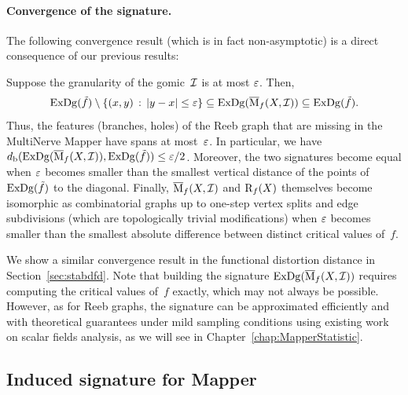 \paragraph*{Convergence of the signature.} The following convergence
result (which is in fact non-asymptotic) is a direct consequence of
our previous results:
%
\begin{cor}\label{cor:Reeb_approx}
Suppose the granularity of the gomic~$\mathcal{I}$ is at most $\varepsilon$. Then, 
%
\[
 \mathrm{ExDg}(\tilde f)\setminus \{(x,y) \,:\, |y-x|\leq \varepsilon\} \subseteq \mathrm{ExDg}(\overline{\mathrm{M}}_f(X, \mathcal{I})) \subseteq \mathrm{ExDg}(\tilde f).
\]
%
Thus, the features (branches, holes) of the Reeb graph that are
missing in the MultiNerve Mapper have spans at most~$\varepsilon$.  In
particular, we have $d_{\rm b}(\mathrm{ExDg}(\overline{\mathrm{M}}_f(X, \mathcal{I})),
\mathrm{ExDg}(\tilde f))\leq \varepsilon/2$.  Moreover, the two signatures become equal
when $\varepsilon$ becomes smaller than the smallest vertical distance of the
points of $\mathrm{ExDg}(\tilde f)$ to the diagonal. Finally, $\overline{\mathrm{M}}_f(X,
\mathcal{I})$ and $\mathrm{R}_f(X)$ themselves become isomorphic as combinatorial graphs up to
one-step vertex splits and edge subdivisions (which are
topologically trivial modifications)
when $\varepsilon$ becomes smaller than the smallest absolute difference
between distinct critical values of~$f$.
\end{cor}
%
We show a similar convergence
result in the functional distortion distance in Section~\ref{sec:stabdfd}.
Note that building the signature $\mathrm{ExDg}(\overline{\mathrm{M}}_f(X, \mathcal{I}))$
requires computing the critical values of~$f$ exactly, which may not
always be possible. However, as for Reeb graphs, the signature can be
approximated efficiently and with theoretical guarantees under mild
sampling conditions using existing work on scalar fields analysis, as
we will see in Chapter~\ref{chap:MapperStatistic}. %


\subsection{Induced signature for Mapper}
\label{sec:MapperSign} 

